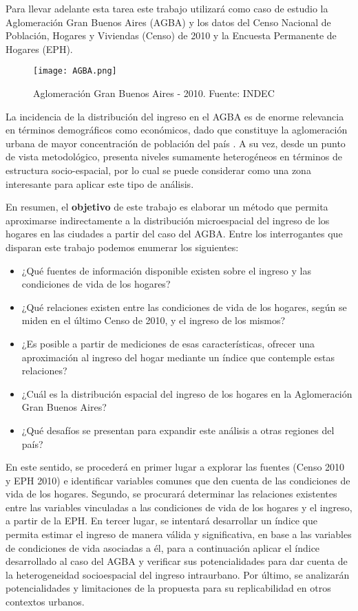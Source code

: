 Para llevar adelante esta tarea este trabajo utilizará como caso de estudio la Aglomeración Gran Buenos Aires (AGBA) y los datos del Censo Nacional de Población, Hogares y Viviendas (Censo) de 2010 y la Encuesta Permanente de Hogares (EPH). 

\begin{figure}[t]
	\begin{center}
		\texttt{[image: AGBA.png]}
		\caption{Aglomeración Gran Buenos Aires - 2010. Fuente: INDEC}
	\end{center}
\end{figure}


La incidencia de la distribución del ingreso en el AGBA es de enorme relevancia en términos demográficos como económicos, dado que constituye la aglomeración urbana de mayor concentración de población del país \cite{indec2012}. A su vez, desde un punto de vista metodológico, presenta niveles sumamente heterogéneos en términos de estructura socio-espacial, por lo cual se puede considerar como una zona interesante para aplicar este tipo de análisis. 

En resumen, el \textbf{objetivo} de este trabajo es elaborar un método que permita aproximarse indirectamente a la distribución microespacial del ingreso de los hogares en las ciudades a partir del caso del AGBA. Entre los interrogantes que disparan este trabajo podemos enumerar los siguientes: 

\begin{itemize}
	\item ¿Qué fuentes de información disponible existen sobre el ingreso y las condiciones de vida de los hogares?
	\item ¿Qué relaciones existen entre las condiciones de vida de los hogares, según se miden en el último Censo de 2010, y el ingreso de los mismos?
	\item ¿Es posible a partir de mediciones de esas características, ofrecer una aproximación al ingreso del hogar mediante un índice que contemple estas relaciones?
	\item ¿Cuál es la distribución espacial del ingreso de los hogares en la Aglomeración Gran Buenos Aires?
	\item ¿Qué desafíos se presentan para expandir este análisis a otras regiones del país?
\end{itemize}

En este sentido, se procederá en primer lugar a explorar las fuentes (Censo 2010 y EPH 2010) e identificar variables comunes que den cuenta de las condiciones de vida de los hogares. Segundo, se procurará determinar las relaciones existentes entre las variables vinculadas a las condiciones de vida de los hogares y el ingreso, a partir de la EPH. En tercer lugar, se intentará desarrollar un índice que permita estimar el ingreso de manera válida y significativa, en base a las variables de condiciones de vida asociadas a él, para a continuación aplicar el índice desarrollado al caso del AGBA y verificar sus potencialidades para dar cuenta de la heterogeneidad socioespacial del ingreso intraurbano. Por último, se analizarán potencialidades y limitaciones de la propuesta para su replicabilidad en otros contextos urbanos.

